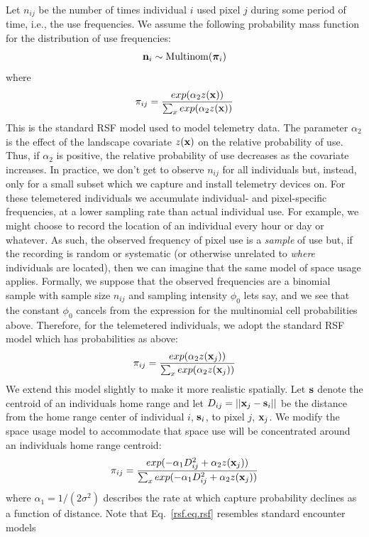 Let $n_{ij}$ be the number of times individual $i$ used pixel $j$
during some period of time, i.e., the use frequencies.  We assume the
following probability mass function for the distribution of use
frequencies:
\[
{\bf n}_{i} \sim \mbox{Multinom}({\bm \pi}_{i})
\]
where
\[
 \pi_{ij} = \frac{ exp( \alpha_{2} z({\bf x}) ) }{ \sum_{x}
   exp(\alpha_{2} z({\bf x}))}
\]
This is the standard RSF model \citep{manly_etal:2002} used to model
telemetry data.  The parameter $\alpha_2$ is the effect of the
landscape covariate $z({\bf x})$ on the relative probability of
use. Thus, if $\alpha_2$ is positive, the relative probability of use
decreases as the covariate increases. In practice, we don't get to
observe $n_{ij}$ for all individuals but, instead, only for a small
subset which we capture and install telemetry devices on.  For these
telemetered individuals we accumulate individual- and pixel-specific
frequencies, at a lower sampling rate than actual individual use. For
example, we might choose to record the location of an individual every
hour or day or whatever. As such, the observed frequency of pixel use
is a {\it sample} of use but, if the recording is random or systematic
(or otherwise unrelated to {\it where} individuals are located), then
we can imagine that the same model of space usage applies. Formally,
we suppose that the observed frequencies are a binomial sample with
sample size $n_{ij}$ and sampling intensity $\phi_{0}$ lets say, and
we see that the constant $\phi_{0}$ cancels from the expression for
the multinomial cell probabilities above. 
Therefore, for the
telemetered individuals, we adopt the standard RSF model which has
probabilities as above:
\[
 \pi_{ij} = \frac{ exp( \alpha_{2} z({\bf x}_{j}) ) }{ \sum_{x}   exp(\alpha_{2} z({\bf x}_{j}))}
\]
We extend this model slightly to make it more realistic spatially. Let
${\bf s}$ denote the centroid of an individuals home range and let
$D_{ij} = ||{\bf x}_{j} - {\bf s}_{i}||$ be the distance from the home
range center of individual $i$, ${\bf s}_{i}$, to pixel $j$, ${\bf
  x}_{j}$. We modify the space usage model to accommodate that space
use will be concentrated around an individuals home range centroid:
\begin{equation}
 \pi_{ij} = \frac{ exp( -\alpha_{1} D_{ij}^{2} +\alpha_{2} z({\bf x}_{j}) ) }
{ \sum_{x} exp(-\alpha_{1} D_{ij}^{2} +\alpha_{2} z({\bf x}_{j}))}
\label{rsf.eq.rsf}
\end{equation}
where $\alpha_1=1/(2\sigma^2)$ describes the rate at which capture probability
declines as a function of distance. Note that Eq.~\ref{rsf.eq.rsf} resembles standard encounter models
